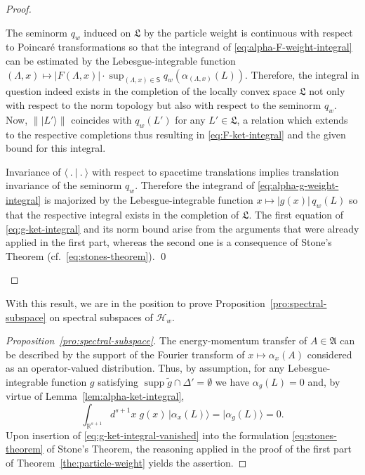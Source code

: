 \documentclass[a4paper,a4paper]{article}
\numberwithin{equation}{section}
\newcommand{\Afrak}{\mathfrak{A}}
\newcommand{\Lfrak}{\mathfrak{L}}
\newcommand{\Hscr}{\mathscr{H}}
\newcommand{\Ssf}{\mathsf{S}}
\newcommand{\Rsone}{\mathbb{R}^{s + 1}}
\newcommand{\aLax}{\alpha_{( \Lambda , x )}}
\newcommand{\ax}{\alpha_x}
\newcounter{proofitem}
\newenvironment{prooflist}{\begin{list}{(\roman{proofitem})}%
  {\usecounter{proofitem} \setlength{\topsep}{0ex}%
   \setlength{\parsep}{0.2ex} \setlength{\itemsep}{0.4ex}%
   \setlength{\leftmargin}{0em} \setlength{\itemindent}{0.5em}%
   \setlength{\listparindent}{1em}}}{\qed \end{list}}
\theoremstyle{definition}
\theoremstyle{plain}
\theoremstyle{remark}
\DeclareMathOperator{\supp}{supp}
\newcommand{\abs}[1]{\lvert #1 \rvert}
\newcommand{\norm}[1]{\lVert #1 \rVert}
\newcommand{\qw}{q_w}
\newcommand{\qwx}[1]{q_w ( #1 )}
\newcommand{\ket}[1]{\vert #1 \rangle}
\newcommand{\bket}[1]{\big\vert #1 \bigr\rangle}
\newcommand{\scp}[2]{\langle #1 \vert #2 \rangle}
\begin{document}
  \begin{proof}
    \begin{prooflist}
    \item The seminorm $\qw$ induced on $\Lfrak$ by the particle
      weight is continuous with respect to Poincar\'e transformations
      so that the integrand of \eqref{eq:alpha-F-weight-integral} can
      be estimated by the Lebesgue-integrable function $( \Lambda , x
      ) \mapsto \abs{F ( \Lambda , x )} \cdot \sup_{( \Lambda , x )
      \in \Ssf} \qwx{\aLax ( L )}$. Therefore, the integral in
      question indeed exists in the completion of the locally convex
      space $\Lfrak$ not only with respect to the norm topology but
      also with respect to the seminorm $\qw$. Now, $\norm{\ket{L'}}$
      coincides with $\qwx{L'}$ for any $L' \in \Lfrak$, a relation
      which extends to the respective completions \cite[Chapter~One,
      \S\,5\,4.(4)]{koethe:1983} thus resulting in
      \eqref{eq:F-ket-integral} and the given bound for this integral.
    \item Invariance of $\scp{~.~}{~.~}$ with respect to spacetime
      translations implies translation invariance of the seminorm
      $\qw$. Therefore the integrand of
      \eqref{eq:alpha-g-weight-integral} is majorized by the
      Lebesgue-integrable function $x \mapsto \abs{g ( x )} \,
      \qwx{L}$ so that the respective integral exists in the
      completion of $\Lfrak$. The first equation of
      \eqref{eq:g-ket-integral} and its norm bound arise from the
      arguments that were already applied in the first part, whereas
      the second one is a consequence of Stone's Theorem
      (cf.~\eqref{eq:stones-theorem}).
    \end{prooflist}
    \renewcommand{\qed}{}
  \end{proof}
  With this result, we are in the position to prove
  Proposition~\ref{pro:spectral-subspace} on spectral subspaces of
  $\Hscr_w$.
  \begin{proof}[Proposition~\ref{pro:spectral-subspace}]
    The energy-momentum transfer of $A \in \Afrak$ can be described by
    the support of the Fourier transform of $x \mapsto \ax ( A )$
    considered as an operator-valued distribution. Thus, by
    assumption, for any Lebesgue-integrable function $g$ satisfying
    $\supp \tilde{g} \cap \Delta' = \emptyset$ we have $\alpha_g ( L )
    = 0$ and, by virtue of Lemma~\ref{lem:alpha-ket-integral},
    \begin{equation}
      \label{eq:g-ket-integral-vanished}
      \int_{\Rsone} d^{s + 1} x \; g ( x ) \, \bket{\ax ( L )} =
      \bket{\alpha_g ( L )} = 0 \text{.}
    \end{equation}
    Upon insertion of \eqref{eq:g-ket-integral-vanished} into the
    formulation \eqref{eq:stones-theorem} of Stone's Theorem, the
    reasoning applied in the proof of the first part of
    Theorem~\ref{the:particle-weight} yields the assertion.
  \end{proof}
\end{document}
